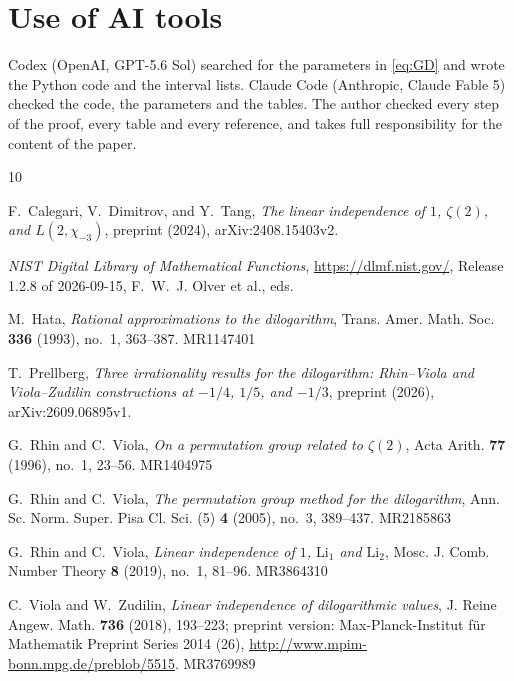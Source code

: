 \documentclass{amsart}
\numberwithin{equation}{section}
\numberwithin{table}{section}
\begin{document}
\section*{Use of AI tools}

Codex (OpenAI, GPT-5.6 Sol) searched for the parameters in \eqref{eq:GD}
and wrote the Python code and the interval lists. Claude Code (Anthropic,
Claude Fable 5) checked the code, the parameters and the tables. The author
checked every step of the proof, every table and every reference, and takes
full responsibility for the content of the paper.

\begin{thebibliography}{10}

F.~Calegari, V.~Dimitrov, and Y.~Tang, \emph{The linear independence of $1$,
$\zeta(2)$, and $L(2,\chi_{-3})$}, preprint (2024), arXiv:2408.15403v2.

\emph{NIST Digital Library of Mathematical Functions},
\url{https://dlmf.nist.gov/}, Release 1.2.8 of 2026-09-15, F.~W.~J. Olver
et al., eds.

M.~Hata, \emph{Rational approximations to the dilogarithm}, Trans. Amer. Math.
Soc. \textbf{336} (1993), no.~1, 363--387. MR1147401

T.~Prellberg, \emph{Three irrationality results for the dilogarithm:
Rhin--Viola and Viola--Zudilin constructions at $-1/4$, $1/5$, and $-1/3$},
preprint (2026), arXiv:2609.06895v1.

G.~Rhin and C.~Viola, \emph{On a permutation group related to $\zeta(2)$},
Acta Arith. \textbf{77} (1996), no.~1, 23--56. MR1404975

G.~Rhin and C.~Viola, \emph{The permutation group method for the dilogarithm},
Ann. Sc. Norm. Super. Pisa Cl. Sci. (5) \textbf{4} (2005), no.~3, 389--437.
MR2185863

G.~Rhin and C.~Viola, \emph{Linear independence of $1$, $\mathrm{Li}_1$ and
$\mathrm{Li}_2$}, Mosc. J. Comb. Number Theory \textbf{8} (2019), no.~1,
81--96. MR3864310

C.~Viola and W.~Zudilin, \emph{Linear independence of dilogarithmic values},
J. Reine Angew. Math. \textbf{736} (2018), 193--223; preprint version:
Max-Planck-Institut f\"ur Mathematik Preprint Series 2014 (26),
\url{http://www.mpim-bonn.mpg.de/preblob/5515}. MR3769989

\end{thebibliography}
\end{document}

